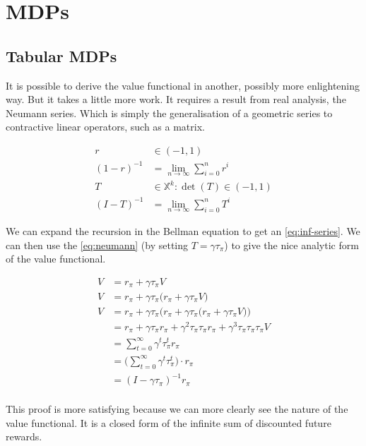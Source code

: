 \chapter{MDPs}

\section{Tabular MDPs}\label{vf-neumann}

It is possible to derive the value functional in another, possibly more enlightening way. But it takes a little more work. It requires a result from real analysis, the Neumann series. Which is simply the generalisation of a geometric series to contractive linear operators, such as a matrix.

\begin{align*}
r &\in (-1, 1) \\
(1-r)^{-1} &= \lim_{n\to \infty} \sum_{i=0}^n r^i \tag{Geometric series}\\
T &\in \mathbb X^k: \det(T) \in (-1, 1) \\
(I-T)^{-1} &= \lim_{n\to \infty} \sum_{i=0}^n T^i \label{eq:neumann}\tag{Neumann series}
\end{align*}

We can expand the recursion in the Bellman equation to get an \eqref{eq:inf-series}. We can then use the \eqref{eq:neumann} (by setting $T=\gamma \tau_{\pi}$) to give the nice analytic form of the value functional.

\begin{align*}
V &= r_{\pi} + \gamma \tau_{\pi} V \tag{Bellman eqn}\\
V &= r_{\pi} + \gamma \tau_{\pi}\big( r_{\pi} + \gamma \tau_{\pi} V\big) \\
V &= r_{\pi} + \gamma \tau_{\pi}\Big(r_{\pi} + \gamma \tau_{\pi}\big( r_{\pi} + \gamma \tau_{\pi} V\big)) \\
&= r_{\pi} + \gamma \tau_{\pi}r_\pi + \gamma^2 \tau_{\pi}\tau_{\pi}r_{\pi} + \gamma^3 \tau_{\pi}\tau_{\pi}\tau_{\pi}V \\
&= \sum_{t=0}^{\infty} \gamma^t\tau_{\pi}^tr_{\pi} \label{eq:inf-series}\tag{infinite series} \\
&= \big( \sum_{t=0}^{\infty} \gamma^t\tau_{\pi}^t \big) \cdot r_{\pi}\\
&= (I-\gamma \tau_{\pi})^{-1} r_{\pi} \tag{value functional}\\
\end{align*}

This proof is more satisfying because we can more clearly see the nature of the value functional. It is a closed form of the infinite sum of discounted future rewards.


